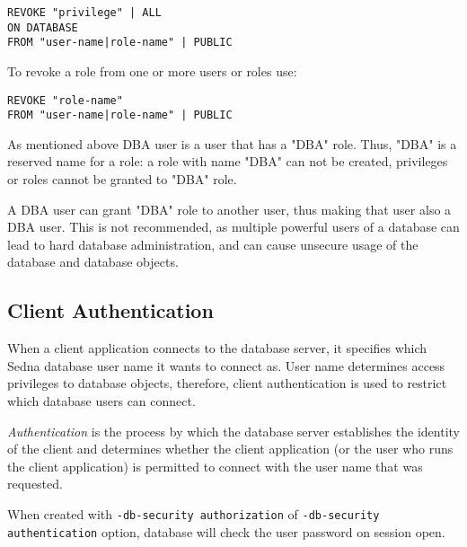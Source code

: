 \documentclass[a4paper,12pt]{article}
\begin{document}

\begin{verbatim}
REVOKE "privilege" | ALL
ON DATABASE 
FROM "user-name|role-name" | PUBLIC
\end{verbatim}

To revoke a role from one or more users or roles use:


\begin{verbatim}
REVOKE "role-name" 
FROM "user-name|role-name" | PUBLIC
\end{verbatim}

As mentioned above DBA user is a user that has a "DBA" role. Thus, "DBA" is a reserved name for a role: a role with name "DBA" can not be created, privileges or roles cannot be granted to "DBA" role.

A DBA user can grant "DBA" role to another user, thus making that user also a DBA user. This is not recommended, as multiple powerful users of a database can lead to hard database administration, and can cause unsecure usage of the database and database objects.


\subsection{Client Authentication}

When a client application connects to the database server, it specifies which Sedna database user name it wants to connect as. User name determines access privileges to database objects, therefore, client authentication is used to restrict which database users can connect.

\emph{Authentication} is the process by which the database server establishes the identity of the client and determines whether the client application (or the user who runs the client application) is permitted to connect with the user name that was requested.

When created with \verb!-db-security authorization! of \verb!-db-security authentication! option, database will check the user password on session open. 
\end{document}
